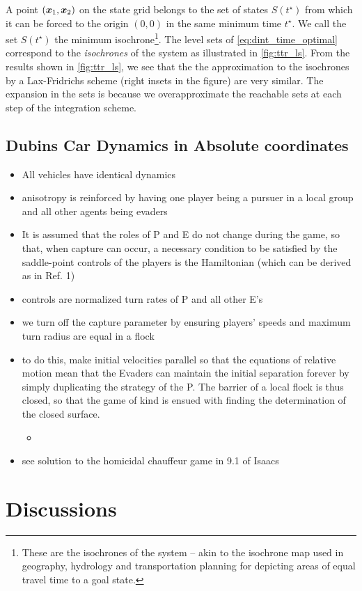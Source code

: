 A point $(\bm{x}_1, \bm{x}_2)$ on the state grid belongs to the set of states $S(t^\star)$ from which it can be forced to the origin $(0, 0)$ in the same minimum time $t^\star$. We call the set $S(t^\star)$ the minimum isochrone\footnote{These are the isochrones of the system -- akin to the isochrone map used in geography, hydrology and transportation planning for depicting areas of equal travel time to a goal state.}. The level sets of \eqref{eq:dint_time_optimal} correspond to the \textit{isochrones} of the system as illustrated in \autoref{fig:ttr_ls}. From the results shown in \autoref{fig:ttr_ls}, we see that the the approximation to the isochrones by a Lax-Fridrichs scheme (right insets in the figure) are very similar. The expansion in the sets is because we overapproximate the reachable sets at each step of the integration scheme.

\subsection{Dubins Car Dynamics in Absolute coordinates}

\begin{itemize}
	\item All vehicles have identical dynamics
	\item anisotropy is reinforced by having one player being a pursuer in a local group and all other agents being evaders
	\item It is assumed that the roles of P and E do not change during the game, so that, when capture can occur, a necessary condition to be satisfied by the saddle-point controls of the players is the Hamiltonian (which can be derived as in Ref. 1) ~\cite{Merz1972}
	\item controls are normalized turn rates of P and all other E's
	\item we turn off the capture parameter by ensuring players' speeds and maximum turn radius are equal in a flock
	\item  to do this, make initial velocities parallel so that the equations of relative motion mean that the Evaders can maintain the initial separation forever by simply duplicating the strategy of the P. The barrier of a local flock is thus closed, so that the game of kind is ensued with finding the determination of the closed surface.
	\begin{itemize}
		\item {}
	\end{itemize}
	\item  see solution to the homicidal chauffeur game in 9.1 of Isaacs
\end{itemize}


\section{Discussions}


